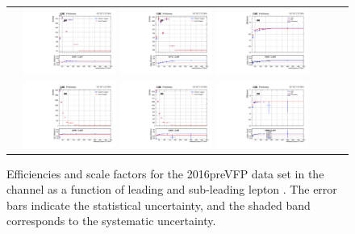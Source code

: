 \begin{figure}[!htb]
  \begin{center}
    \begin{tabular}{ccc}
      \includegraphics[width=0.30\textwidth]{fig_2016preVFP_TrigSF/g_lepApt_ee_MC.pdf}
      \includegraphics[width=0.30\textwidth]{fig_2016preVFP_TrigSF/g_lepApt_ee_data.pdf}
      \includegraphics[width=0.30\textwidth]{fig_2016preVFP_TrigSF/g_ee_lepApt_FullSystUncBand.pdf}\\
      \includegraphics[width=0.30\textwidth]{fig_2016preVFP_TrigSF/g_lepBpt_ee_MC.pdf}
      \includegraphics[width=0.30\textwidth]{fig_2016preVFP_TrigSF/g_lepBpt_ee_data.pdf}
      \includegraphics[width=0.30\textwidth]{fig_2016preVFP_TrigSF/g_ee_lepBpt_FullSystUncBand.pdf}\\
    \end{tabular}
    \caption{Efficiencies and scale factors for the 2016preVFP data set in the \ee channel as a function of leading and sub-leading lepton \pT.
            The error bars indicate the statistical uncertainty, and the shaded band corresponds to the systematic uncertainty.
            }
    \label{TrigSF_2016preVFP_2}
  \end{center}
\end{figure}

